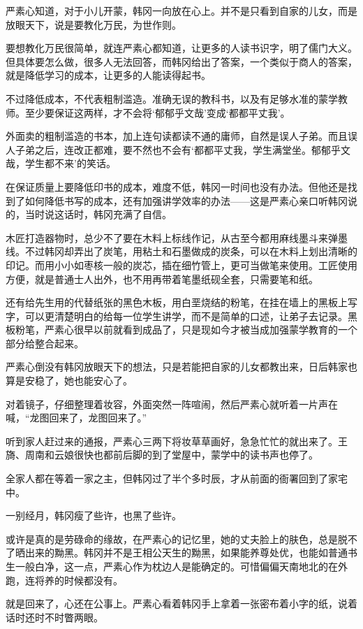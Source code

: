严素心知道，对于小儿开蒙，韩冈一向放在心上。并不是只看到自家的儿女，而是放眼天下，说是要教化万民，为世作则。

要想教化万民很简单，就连严素心都知道，让更多的人读书识字，明了儒门大义。但具体要怎么做，很多人无法回答，而韩冈给出了答案，一个类似于商人的答案，就是降低学习的成本，让更多的人能读得起书。

不过降低成本，不代表粗制滥造。准确无误的教科书，以及有足够水准的蒙学教师。至少要保证这两样，才不会将‘郁郁乎文哉’变成‘都都平丈我’。

外面卖的粗制滥造的书本，加上连句读都读不通的庸师，自然是误人子弟。而且误人子弟之后，连改正都难，要不然也不会有‘都都平丈我，学生满堂坐。郁郁乎文哉，学生都不来’的笑话。

在保证质量上要降低印书的成本，难度不低，韩冈一时间也没有办法。但他还是找到了如何降低书写的成本，还有加强讲学效率的办法——这是严素心亲口听韩冈说的，当时说这话时，韩冈充满了自信。

木匠打造器物时，总少不了要在木料上标线作记，从古至今都用麻线墨斗来弹墨线。不过韩冈却弄出了炭笔，用粘土和石墨做成的炭条，可以在木料上划出清晰的印记。而用小小如枣核一般的炭芯，插在细竹管上，更可当做笔来使用。工匠使用方便，就是普通士人出外，也不用再带着笔墨纸砚全套，只需要笔和纸。

还有给先生用的代替纸张的黑色木板，用白垩烧结的粉笔，在挂在墙上的黑板上写字，可以更清楚明白的给每一位学生讲学，而不是简单的口述，让弟子去记录。黑板粉笔，严素心很早以前就看到成品了，只是现如今才被当成加强蒙学教育的一个部分给整合起来。

严素心倒没有韩冈放眼天下的想法，只是若能把自家的儿女都教出来，日后韩家也算是安稳了，她也能安心了。

对着镜子，仔细整理着妆容，外面突然一阵喧闹，然后严素心就听着一片声在喊，“龙图回来了，龙图回来了。”

听到家人赶过来的通报，严素心三两下将妆草草画好，急急忙忙的就出来了。王旖、周南和云娘很快也都前后脚的到了堂屋中，蒙学中的读书声也停了。

全家人都在等着一家之主，但韩冈过了半个多时辰，才从前面的衙署回到了家宅中。

一别经月，韩冈瘦了些许，也黑了些许。

或许是真的是劳碌命的缘故，在严素心的记忆里，她的丈夫脸上的肤色，总是脱不了晒出来的黝黑。韩冈并不是王相公天生的黝黑，如果能养尊处优，也能如普通书生一般白净，这一点，严素心作为枕边人是能确定的。可惜偏偏天南地北的在外跑，连将养的时候都没有。

就是回来了，心还在公事上。严素心看着韩冈手上拿着一张密布着小字的纸，说着话时还时不时瞥两眼。

